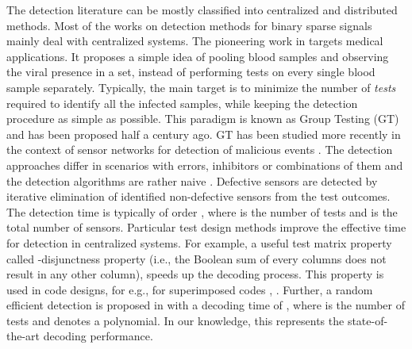 \documentclass[journal]{IEEEtran}
\begin{document}
The detection literature can be mostly classified into centralized and distributed methods. Most of the works on detection methods for binary sparse signals mainly deal with centralized systems. The pioneering work in \cite{Dorfman:43} targets medical applications. It proposes a simple idea of pooling blood samples and observing the viral presence in a set, instead of performing tests on every single blood sample separately. Typically, the main target is to minimize the number of \textit{tests} required to identify all the infected samples, while keeping the detection procedure as simple as possible. This paradigm is known as Group Testing (GT) and has been proposed half a century ago. GT has been studied more recently in the context of sensor networks for detection of malicious events \cite{Young:11}. The detection approaches differ in scenarios with errors, inhibitors or combinations of them and the detection algorithms are rather naive \cite{Chen:08}. Defective sensors are detected  by iterative elimination of identified non-defective sensors from the test outcomes. The detection time is typically of order , where  is the number of tests and  is the total number of sensors. Particular test design methods improve the effective time for detection in centralized systems. For example, a useful test matrix property called -disjunctness property (i.e., the Boolean sum of every  columns does not result in any other column), speeds up the decoding process. This property is used in code designs, for e.g., for superimposed codes \cite{Dai:2009}, \cite{DeBonis:03}. Further, a random efficient detection is proposed in \cite{Indyk:10} with a decoding time of , where  is the number of tests and  denotes a polynomial. In our knowledge, this represents the state-of-the-art decoding performance.
\end{document}
